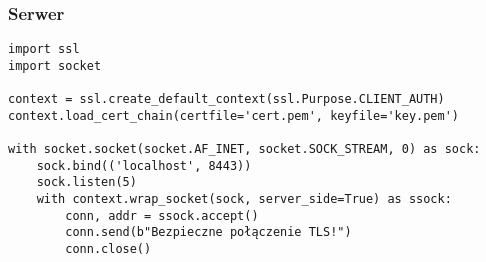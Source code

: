 \subsubsection{Serwer}
\begin{verbatim}
import ssl
import socket

context = ssl.create_default_context(ssl.Purpose.CLIENT_AUTH)
context.load_cert_chain(certfile='cert.pem', keyfile='key.pem')

with socket.socket(socket.AF_INET, socket.SOCK_STREAM, 0) as sock:
    sock.bind(('localhost', 8443))
    sock.listen(5)
    with context.wrap_socket(sock, server_side=True) as ssock:
        conn, addr = ssock.accept()
        conn.send(b"Bezpieczne połączenie TLS!")
        conn.close()
\end{verbatim}
